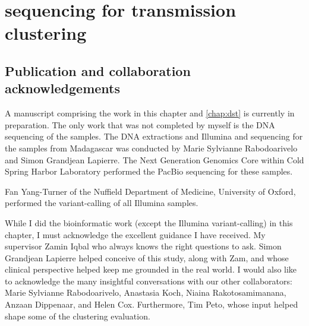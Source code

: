 
\chapter{\ont{} sequencing for \mtb{} transmission clustering}
\label{chap:clustering}

\ifpdf
    \graphicspath{{Chapter2/Figs/Raster/}{Chapter2/Figs/PDF/}{Chapter2/Figs/}}
\else
    \graphicspath{{Chapter2/Figs/Vector/}{Chapter2/Figs/}}
\fi


\setcounter{section}{-1}
\section{Publication and collaboration acknowledgements}
\label{sec:ch2-acknowledge}

A manuscript comprising the work in this chapter and \autoref{chap:dst} is currently in preparation. The only work that was not completed by myself is the DNA sequencing of the samples.
The DNA extractions and Illumina and \ont{} sequencing for the samples from Madagascar was conducted by Marie Sylvianne Rabodoarivelo and Simon Grandjean Lapierre. The Next Generation Genomics Core within Cold Spring Harbor Laboratory performed the PacBio sequencing for these samples.



Fan Yang-Turner of the Nuffield Department of Medicine, University of Oxford, performed the variant-calling of all Illumina samples. 

While I did the bioinformatic work (except the Illumina variant-calling) in this chapter, I must acknowledge the excellent guidance I have received. My supervisor Zamin Iqbal who always knows the right questions to ask. Simon Grandjean Lapierre helped conceive of this study, along with Zam, and whose clinical perspective helped keep me grounded in the real world. I would also like to acknowledge the many insightful conversations with our other collaborators: Marie Sylvianne Rabodoarivelo, Anastasia Koch, Niaina Rakotosamimanana, Anzaan Dippenaar, and Helen Cox. Furthermore, Tim Peto, whose input helped shape some of the clustering evaluation.

